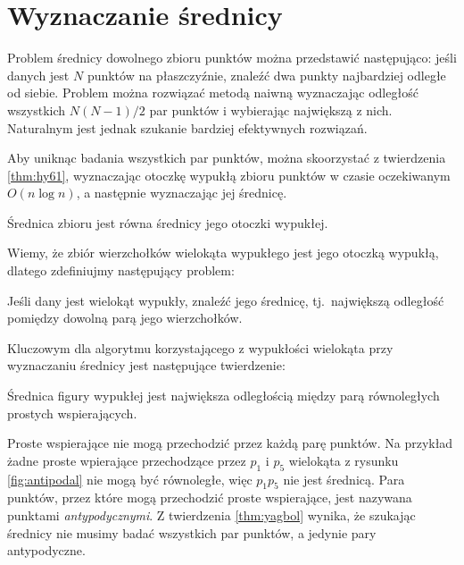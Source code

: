 \chapter{Wyznaczanie średnicy}
Problem średnicy dowolnego zbioru punktów można przedstawić
następująco: jeśli danych jest $N$ punktów na płaszczyźnie, znaleźć
dwa punkty najbardziej odległe od siebie. Problem można rozwiązać
metodą naiwną wyznaczając odległość wszystkich $N(N-1)/2$ par punktów
i wybierając największą z nich. Naturalnym jest jednak szukanie
bardziej efektywnych rozwiązań.

Aby uniknąc badania wszystkich par punktów, można skoorzystać z
twierdzenia \ref{thm:hy61}, wyznaczając otoczkę wypukłą zbioru
punktów w czasie oczekiwanym $O(n \log n)$, a następnie wyznaczając
jej średnicę.

\begin{twierdzenie}

  Średnica zbioru jest równa średnicy jego otoczki wypukłej.
\end{twierdzenie}

Wiemy, że zbiór wierzchołków wielokąta wypukłego jest jego otoczką
wypukłą, dlatego zdefiniujmy następujący problem:

\begin{problem}
  Jeśli dany jest wielokąt wypukły, znaleźć jego średnicę,
  tj.\ największą odległość pomiędzy dowolną parą jego wierzchołków.
\end{problem}



Kluczowym dla algorytmu korzystającego z wypukłości wielokąta przy
wyznaczaniu średnicy jest następujące twierdzenie:

\begin{twierdzenie}
\label{thm:yagbol}
  Średnica figury wypukłej jest największa odległością między parą
  równoległych prostych wspierających.
\end{twierdzenie}

Proste wspierające nie mogą przechodzić przez każdą parę punktów. Na
przykład żadne proste wpierające przechodzące przez $p_1$ i $p_5$
wielokąta z rysunku \ref{fig:antipodal} nie mogą być równoległe, więc
$p_{1}p_{5}$ nie jest średnicą. Para punktów, przez które mogą
przechodzić proste wspierające, jest nazywana punktami
\emph{antypodycznymi}. Z twierdzenia \ref{thm:yagbol} wynika, że
szukając średnicy nie musimy badać wszystkich par punktów, a jedynie
pary antypodyczne.

